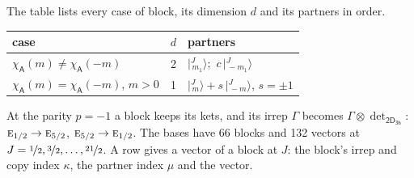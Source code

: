 \documentclass[10pt,a4paper]{article}
\numberwithin{equation}{section}
\newcommand{\grp}[1]{\mathsf{#1}}
\newcommand{\irr}[1]{\text{\normalfont\scshape #1}}
\newcommand{\chiA}{\chi_{\grp{A}}}
\newcommand{\irrprod}{\otimes}
\newcommand{\mult}{\kappa}
\newcommand{\intx}{\mu}
\newcommand{\jm}[2]{\bigl\lvert{}^{#1}_{\,#2}\bigr\rangle}
\begin{document}
\leavevmode\label{n:head.case}\label{n:head.partners}The table lists every case of block, its dimension $d$ and its partners in order.
\begin{center}\begin{tabular}{@{}lrl@{}}\toprule
case & $d$ & partners\\\midrule
$\chiA(m) \ne \chiA(-m)$ & 2 & $\jm{J}{m_1}$;\ $c\,\jm{J}{-m_1}$\\
$\chiA(m) = \chiA(-m)$, $m > 0$ & 1 & $\jm{J}{m} + s\,\jm{J}{-m}$, $s = \pm1$\\
\bottomrule\end{tabular}\end{center}
At the parity $p = -1$ a block keeps its kets, and its irrep $\Gamma$ becomes $\Gamma \irrprod \det_{\grp{2D_{3h}}}$: $\irr{e}_{1/2} \to \irr{e}_{5/2}$, $\irr{e}_{5/2} \to \irr{e}_{1/2}$.
The bases have 66 blocks and 132 vectors at $J = \nicefrac{1}{2}, \nicefrac{3}{2}, \dots, \nicefrac{21}{2}$. \label{n:head.vector}A row gives a vector of a block at $J$: the block's irrep and copy index $\mult$, the partner index $\intx$ and the vector.
\end{document}
